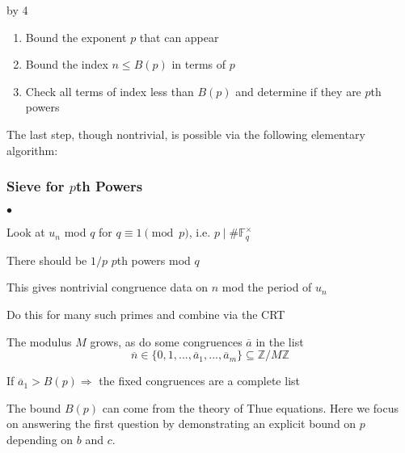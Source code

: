 \documentclass[12pt]{scrartcl}
\newenvironment{citemize}{
\begin{list}{$\bullet$}{\setlength{\itemsep}{0pt} \setlength{\rightmargin}{0pt} \setlength{\leftmargin}{0.5\labelwidth} \setlength{\topsep}{0pt}}
}{\end{list}}
\def\F{{\mathbb F}}
\def\Z{{\mathbb Z}}
\renewcommand{\bar}{\overline}
\def\anzspalten{4}
\newlength{\kastenwidth}
\newenvironment{kasten}{%
  \begin{lrbox}{\dummybox}%
    \begin{minipage}{0.96\linewidth}}%
    {\end{minipage}%
  \end{lrbox}%
  \raisebox{-\depth}{\psshadowbox[framesep=1em]{\usebox{\dummybox}}}\\[0.5em]}
\newenvironment{spalte}{%
  \setlength\kastenwidth{1.2\textwidth}
  \divide\kastenwidth by \anzspalten
  \begin{minipage}[t]{\kastenwidth}}{\end{minipage}\hfill}
\begin{document}
\begin{lrbox}{\spalten}
{\begin{spalte}
\begin{kasten}
\begin{enumerate}
\item Bound the exponent $p$ that can appear

\item Bound the index $n \leq B(p)$ in terms of $p$

\item Check all terms of index less than $B(p)$ and determine if they are $p$th powers

\end{enumerate}
The last step, though nontrivial, is possible via the following elementary algorithm:
\subsubsection*{\color{red} Sieve for $p$th Powers}

\begin{citemize}

\item Look at $u_n$ mod $q$ for $q \equiv 1 \pmod{p}$, i.e. $p \mid \#\F_q^\times$

\item There should be $1/p$ $p$th powers mod $q$



\item This gives nontrivial congruence data on $n$ mod the period of $u_n$



\item Do this for many such primes and combine via the CRT


\item The modulus $M$ grows, as do some congruences $\bar{a}$ in the list
\[ \bar{n} \in \{0,1,...,\bar{a}_1,...,\bar{a}_m\} \subseteq \Z/M\Z \]


\item If $\bar{a}_1 > B(p) \Rightarrow $ the fixed congruences are a complete list

\end{citemize}


The bound $B(p)$ can come from the theory of Thue equations.  Here we focus on answering the first question by demonstrating an explicit bound on $p$ depending on $b$ and $c$.

\end{kasten}


\end{spalte}}
\end{lrbox}
\end{document}
